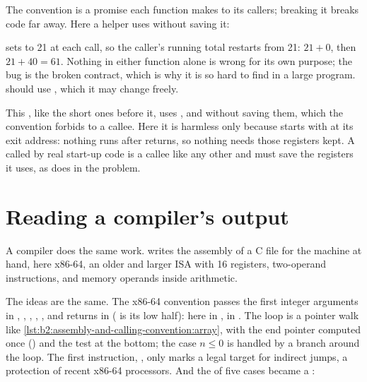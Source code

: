 The convention is a promise each function makes to its callers; breaking it breaks code far away. Here a helper
uses  without saving it:

\label{lst:b2:assembly-and-calling-convention:clobber}

\label{out:b2:assembly-and-calling-convention:clobber}

 sets  to 21 at each call, so the caller's running total restarts from 21: $21 + 0$, then $21 +
40 = 61$. Nothing in either function alone is wrong for its own purpose; the bug is the broken contract, which is why
it is so hard to find in a large program.  should use , which it may change freely.

This , like the short ones before it, uses ,  and  without saving them,
which the convention forbids to a callee. Here it is harmless only because  starts  with
 at its exit address: nothing runs after  returns, so nothing needs those registers kept. A
 called by real start-up code is a callee like any other and must save the  registers it uses, as
 does in the problem.

\section{Reading a compiler's output}\label{sec:b2:assembly-and-calling-convention:compiler}

A compiler does the same work.  writes the assembly of a C file for the machine at hand, here
x86-64, an older and larger ISA with 16 registers, two-operand instructions, and memory operands inside arithmetic.

\label{out:b2:assembly-and-calling-convention:gcc-sum}

The ideas are the same. The x86-64 convention passes the first integer arguments in , ,
, , ,  and returns in  ( is its low half): here  in
,  in . The loop is a pointer walk like \cref{lst:b2:assembly-and-calling-convention:array},
with the end pointer computed once () and the test at the bottom; the case $n \le 0$ is handled by a
branch around the loop. The first instruction, , only marks a legal target for indirect jumps, a
protection of recent x86-64 processors. And the  of five cases became a :

